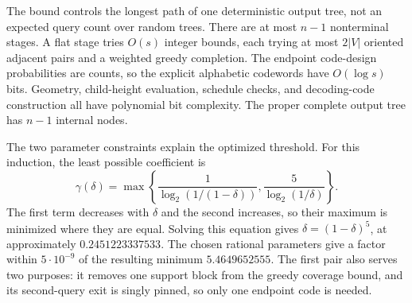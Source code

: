 The bound controls the longest path of one deterministic output
tree, not an expected query count over random trees.
There are at most $n-1$ nonterminal stages. A flat stage tries
$O(s)$ integer bounds, each trying at most $2|V|$ oriented adjacent
pairs and a weighted greedy completion.
The endpoint code-design probabilities are counts, so
the explicit alphabetic codewords have $O(\log s)$ bits.
Geometry, child-height evaluation, schedule checks, and decoding-code
construction all have polynomial bit complexity.
The proper complete output tree has $n-1$ internal nodes.

The two parameter constraints explain the optimized threshold.
For this induction, the least possible coefficient is
\[
 \gamma(\delta)=
 \max\left\{\frac1{\log_2(1/(1-\delta))},
             \frac5{\log_2(1/\delta)}\right\}.
\]
The first term decreases with $\delta$ and the second increases,
so their maximum is minimized where they are equal. Solving this
equation gives $\delta=(1-\delta)^5$, at approximately
$0.2451223337533$.
The chosen rational parameters give a factor within $5\cdot10^{-9}$
of the resulting minimum $5.4649652555$.
The first pair also serves two purposes: it removes one support
block from the greedy coverage bound, and its second-query exit is
singly pinned, so only one endpoint code is needed.
